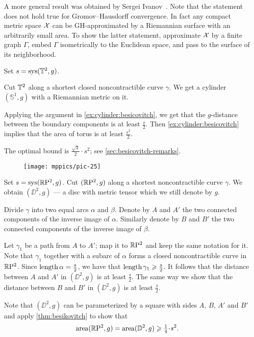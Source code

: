 A more general result was obtained by Sergei Ivanov~\cite{ivanov-1997}.
Note that the statement does not hold true for Gromov--Hausdorff convergence.
In fact any compact metric space $\mathcal{X}$ can be GH-approximated by a Riemannian surface with an arbitrarily small area.
To show the latter statement, approximate $\mathcal{X}$ by a finite graph $\Gamma$, embed $\Gamma$ isometrically to the Euclidean space, and pass to the surface of its neighborhood.

Set $s=\mathop{\rm sys}\nolimits(\mathbb{T}^2,g)$.

Cut $\mathbb{T}^2$ along a shortest closed noncontractible curve $\gamma$.
We get a cylinder $(\mathbb{S}^1,g)$ with a Riemannian metric on it.

Applying the argument in \ref{ex:cylinder:besicovitch}, we get that the $g$-distance between the boundary components is at least $\tfrac s2$.
Then \ref{ex:cylinder:besicovitch} implies that the area of torus is at least $\tfrac{s^2}2$.

The optimal bound is $\tfrac{\sqrt{3}}{2}\cdot s^2$; see  \ref{sec:besicovitch-remarks}.

\begin{wrapfigure}{r}{44 mm}
\vskip-4mm
\centering
\texttt{[image: mppics/pic-25]}
\end{wrapfigure}

Set $s\z=\sys (\RP^2,g)$.
Cut $(\mathbb{R}\mathrm{P}^2,g)$ along a shortest noncontractible curve $\gamma$.
We obtain $(\DD^2,g)$ --- a disc with metric tensor which we still denote by $g$.

Divide $\gamma$ into two equal arcs $\alpha$ and $\beta$.
Denote by $A$ and $A'$ the two connected components of the inverse image of $\alpha$.
Similarly denote by $B$ and $B'$ the two connected components of the inverse image of $\beta$.

Let $\gamma_1$ be a path from $A$ to $A'$;
map it to $\mathbb{R}\mathrm{P}^2$ and keep the same notation for it.
Note that $\gamma_1$ together with a subarc of $\alpha$ forms a closed noncontractible curve in $\mathbb{R}\mathrm{P}^2$.
Since $\mathop{\rm length}\nolimits\alpha=\tfrac s2$, we have that $\mathop{\rm length}\nolimits\gamma_1\geqslant \tfrac s2$.
It follows that the distance between $A$ and $A'$ in $(\DD^2,g)$ is at least $\tfrac s2$.
The same way we show that the distance between $B$ and $B'$ in $(\DD^2,g)$ is at least $\tfrac s2$.

Note that $(\DD^2,g)$ can be parameterized by a square with sides $A$, $B$, $A'$ and $B'$ and apply \ref{thm:besikovitch} to show that 
\[\area(\RP^2,g)=\area(\DD^2,g)\ge \tfrac14\cdot s^2.\]

